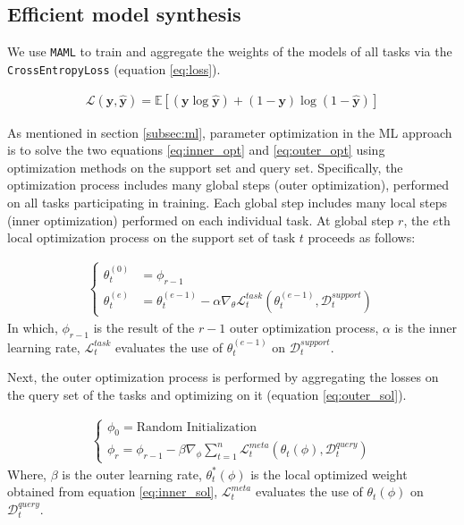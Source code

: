 \documentclass[a4paper,fleqn]{cas-sc}
\begin{document}
\subsection{Efficient model synthesis}

We use \verb|MAML| to train and aggregate the weights of the models of all tasks via the \verb|CrossEntropyLoss| (equation \ref{eq:loss}).

\begin{align}
    \mathcal{L}(\mathbf{y}, \hat{\mathbf{y}}) = \mathbb{E}\left[(\mathbf{y}\log{\hat{\mathbf{y}}}) + (1-\mathbf{y})\log{(1-\hat{\mathbf{y}})}\right]
    \label{eq:loss}
\end{align}

As mentioned in section \ref{subsec:ml}, parameter optimization in the ML approach is to solve the two equations \ref{eq:inner_opt} and \ref{eq:outer_opt} using optimization methods on the support set and query set. Specifically, the optimization process includes many global steps (outer optimization), performed on all tasks participating in training. Each global step includes many local steps (inner optimization) performed on each individual task. At global step $r$, the $e$th local optimization process on the support set of task $t$ proceeds as follows:

\begin{align}
    \begin{cases}
        \theta_t^{(0)} &= \phi_{r-1} \\
        \theta_t^{(e)} &= \theta_t^{(e-1)} - \alpha \nabla_{\theta} \mathcal{L}^{task}_t\left( \theta_t^{(e-1)}, \mathcal{D}_t^{support} \right)
    \end{cases}
    \label{eq:inner_sol}
\end{align} In which, $\phi_{r-1}$ is the result of the $r-1$ outer optimization process, $\alpha$ is the inner learning rate, $\mathcal{L}_t^{task}$ evaluates the use of $\theta_t^{(e-1)}$ on $\mathcal{D}_t^{support}$.

\vspace{1mm}

Next, the outer optimization process is performed by aggregating the losses on the query set of the tasks and optimizing on it (equation \ref{eq:outer_sol}).

\begin{align}
    \begin{cases}
        \phi_0 = \text{Random Initialization}\\
        \phi_r = \phi_{r-1} - \beta \nabla_{\phi} \sum_{t=1}^n{\mathcal{L}^{meta}_t \left( \theta_t(\phi), \mathcal{D}_t^{query} \right)}
    \end{cases}
    \label{eq:outer_sol}
\end{align} Where, $\beta$ is the outer learning rate, $\theta_t^*(\phi)$ is the local optimized weight obtained from equation \ref{eq:inner_sol}, $\mathcal{L}_t^{meta}$ evaluates the use of $\theta_t(\phi)$ on $\mathcal{D}_t^{query}$.
\end{document}
